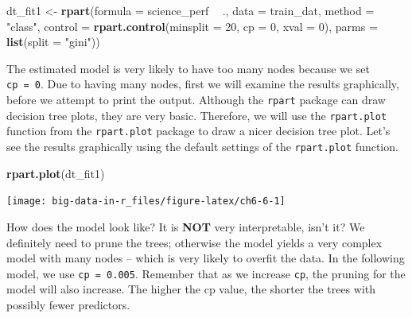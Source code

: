 \documentclass[]{book}
\newenvironment{Shaded}{\begin{snugshade}}{\end{snugshade}}
\newcommand{\DataTypeTok}[1]{\textcolor[rgb]{0.13,0.29,0.53}{#1}}
\newcommand{\DecValTok}[1]{\textcolor[rgb]{0.00,0.00,0.81}{#1}}
\newcommand{\KeywordTok}[1]{\textcolor[rgb]{0.13,0.29,0.53}{\textbf{#1}}}
\newcommand{\NormalTok}[1]{#1}
\newcommand{\OperatorTok}[1]{\textcolor[rgb]{0.81,0.36,0.00}{\textbf{#1}}}
\newcommand{\StringTok}[1]{\textcolor[rgb]{0.31,0.60,0.02}{#1}}
\begin{document}
\begin{Shaded}
\begin{Highlighting}[]
\NormalTok{dt_fit1 <-}\StringTok{ }\KeywordTok{rpart}\NormalTok{(}\DataTypeTok{formula =}\NormalTok{ science_perf }\OperatorTok{~}\StringTok{ }\NormalTok{.,}
                 \DataTypeTok{data =}\NormalTok{ train_dat,}
                 \DataTypeTok{method =} \StringTok{"class"}\NormalTok{, }
                 \DataTypeTok{control =} \KeywordTok{rpart.control}\NormalTok{(}\DataTypeTok{minsplit =} \DecValTok{20}\NormalTok{, }
                                         \DataTypeTok{cp =} \DecValTok{0}\NormalTok{, }
                                         \DataTypeTok{xval =} \DecValTok{0}\NormalTok{),}
                \DataTypeTok{parms =} \KeywordTok{list}\NormalTok{(}\DataTypeTok{split =} \StringTok{"gini"}\NormalTok{))}
\end{Highlighting}
\end{Shaded}

The estimated model is very likely to have too many nodes because we set \texttt{cp\ =\ 0}. Due to having many nodes, first we will examine the results graphically, before we attempt to print the output. Although the \texttt{rpart} package can draw decision tree plots, they are very basic. Therefore, we will use the \texttt{rpart.plot} function from the \texttt{rpart.plot} package to draw a nicer decision tree plot. Let's see the results graphically using the default settings of the \texttt{rpart.plot} function.

\begin{Shaded}
\begin{Highlighting}[]
\KeywordTok{rpart.plot}\NormalTok{(dt_fit1)}
\end{Highlighting}
\end{Shaded}

\texttt{[image: big-data-in-r\_files/figure-latex/ch6-6-1]}

How does the model look like? It is \textbf{NOT} very interpretable, isn't it? We definitely need to prune the trees; otherwise the model yields a very complex model with many nodes -- which is very likely to overfit the data. In the following model, we use \texttt{cp\ =\ 0.005}. Remember that as we increase \texttt{cp}, the pruning for the model will also increase. The higher the cp value, the shorter the trees with possibly fewer predictors.
\end{document}
